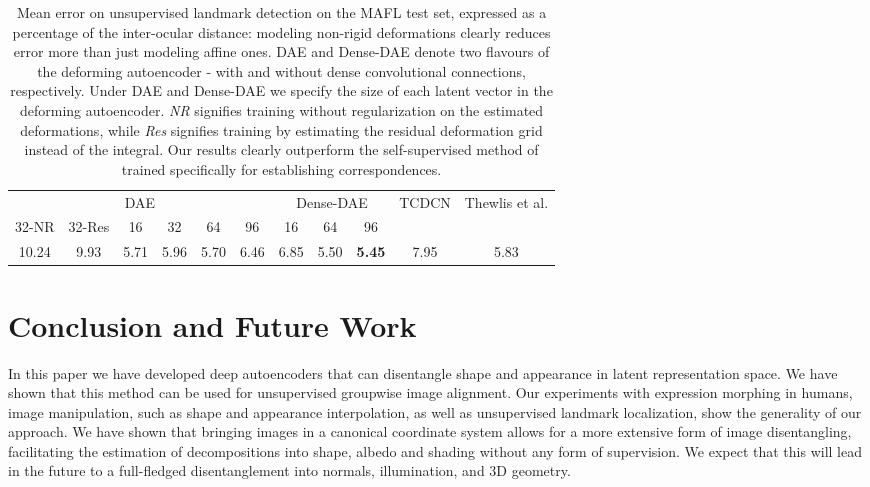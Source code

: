 \documentclass[runningheads]{llncs}
\begin{document}
\begin{table}[ht!]
 \vspace{-0.2cm}
 \centering
\begin{tabular}{c c c c c c | c c c | c | c}
   \multicolumn{6}{c|}{DAE} & \multicolumn{3}{c|}{Dense-DAE} & \multirow{2}{*}{TCDCN\cite{zhang2016learning}} & \multirow{2}{*}{Thewlis et al.\cite{ThewlisBV17a}} \\
  \cline{1-9}
  32-NR & 32-Res & 16 & 32 & 64 & 96 & 16 & 64 & 96 & & \\
  \hline
  10.24 & 9.93 & 5.71 & 5.96 & 5.70 & 6.46 & 6.85 & 5.50 & \textbf{5.45} & 7.95 & 5.83 \\
  \hline
 \end{tabular}
 \caption{Mean error on unsupervised landmark detection on the MAFL test set, expressed as a percentage of the inter-ocular distance: modeling non-rigid deformations clearly reduces error more than just modeling affine ones. DAE and Dense-DAE denote two flavours of the deforming autoencoder - with and without dense convolutional connections, respectively. Under DAE and Dense-DAE we specify the size of each latent vector in the deforming autoencoder. \emph{NR} signifies training without regularization on the estimated deformations, while \emph{Res} signifies training by estimating the residual deformation grid instead of the integral. Our results clearly outperform the self-supervised method of \cite{ThewlisBV17a} trained specifically for establishing correspondences.}
 \label{tab:evalMAFL}
 \vspace{-0.8cm}
\end{table}


\section{Conclusion and Future Work}

In this paper we have  developed deep autoencoders that can disentangle shape and appearance  in latent representation space. 
We have  shown that this method can be used for unsupervised groupwise image alignment. Our experiments with expression morphing in humans, image manipulation, such as shape and appearance interpolation,  as well as unsupervised landmark localization, show the generality of our approach. 
We have shown that bringing images in a canonical coordinate system allows for a more extensive form of image disentangling, facilitating the estimation of  decompositions into shape, albedo and shading without any form of supervision. We expect that this will lead in the future to a full-fledged disentanglement into normals, illumination, and 3D geometry.
\end{document}
